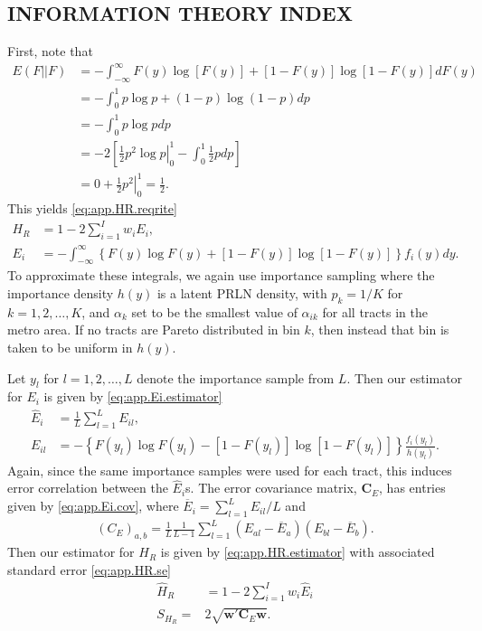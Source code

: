 \documentclass[12pt]{article}
\begin{document}
\subsection{INFORMATION THEORY INDEX}\label{app:compute.info}
First, note that
\begin{align*}
  E(F||F) &= -\int_{-\infty}^\infty F(y) \log[F(y)] + [1 - F(y)] \log[1 - F(y)] dF(y) \\
          &=-\int_{0}^1 p \log p + (1-p) \log (1-p) dp \\
          &= - \int_0^1 p\log p dp \\
          &= -2 \left[\left.\frac{1}{2}p^2 \log p \right|_0^1 - \int_0^1\frac{1}{2}p dp\right] \\
          & = 0 + \left.\frac{1}{2}p^2\right|_0^1 = \frac{1}{2}.
\end{align*}
This yields \eqref{eq:app.HR.reqrite}
\begin{align}
  H_R &= 1 - 2\sum_{i=1}^Iw_iE_i, \nonumber\\
  E_i &= -\int_{-\infty}^{\infty}\left\{F(y)\log F(y) + [1 - F(y)] \log[1 - F(y)]\right\}f_i(y)dy.  \label{eq:app.HR.reqrite}
\end{align}
To approximate these integrals, we again use importance sampling where the importance density $h(y)$ is a latent PRLN density, with $p_k = 1/K$ for $k=1,2,\dots,K$, and $\alpha_k$ set to be the smallest value of $\alpha_{ik}$ for all tracts in the metro area. If no tracts are Pareto distributed in bin $k$, then instead that bin is taken to be uniform in $h(y)$. 

Let $y_l$ for $l=1,2,\dots,L$ denote the importance sample from $L$. Then our estimator for $E_i$ is given by \eqref{eq:app.Ei.estimator}
\begin{align}
  \widehat{E}_i &= \frac{1}{L} \sum_{l=1}^LE_{il}, \nonumber\\
  E_{il} & = -\left\{F(y_l)\log F(y_l) - [1 - F(y_l)] \log[1 - F(y_l)]\right\}\frac{f_i(y_l)}{h(y_l)}.
  \label{eq:app.Ei.estimator}
\end{align}
Again, since the same importance samples were used for each tract, this induces error correlation between the $\widehat{E}_i$s. The error covariance matrix, $\bm{C}_{E}$, has entries given by \eqref{eq:app.Ei.cov}, where $\overline{E}_i = \sum_{l=1}^LE_{il} / L$ and
\begin{align}
\left(C_E\right)_{a,b} = \frac{1}{L}\frac{1}{L-1}\sum_{l=1}^L(E_{al} - \overline{E}_a)(E_{bl} - \overline{E}_b). \label{eq:app.Ei.cov}
\end{align}
Then our estimator for $H_R$ is given by \eqref{eq:app.HR.estimator} with associated standard error \eqref{eq:app.HR.se}
\begin{align}
  \widehat{H}_R &= 1 - 2\sum_{i=1}^Iw_i\widehat{E}_i \label{eq:app.HR.estimator} \\
  S_{H_R} = & 2 \sqrt{\bm{w}'\bm{C}_E\bm{w}}. \label{eq:app.HR.se}
\end{align}
\end{document}
